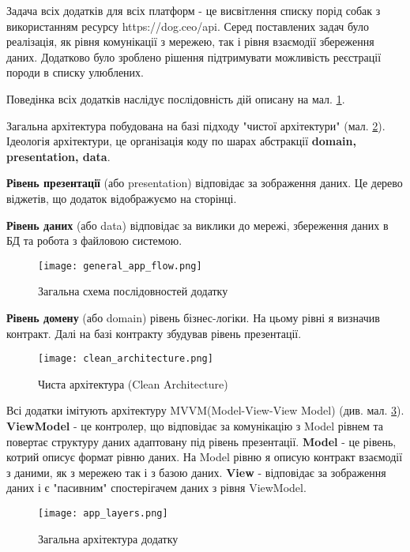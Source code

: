 Задача всіх додатків для всіх платформ - це висвітлення списку порід собак з використанням ресурсу https://dog.ceo/api.
Серед поставлених задач було реалізація, як рівня комунікації з мережею, так і рівня взаємодії збереження
даних. Додатково було зроблено рішення підтримувати можливість реєстрації породи в списку улюблених.

Поведінка всіх додатків наслідує послідовність дій описану на мал. \ref{fig:gen_app_flow}.

Загальна архітектура побудована на базі підходу "чистої архітектури" (мал. \ref{fig:clean_architecture}).
Ідеологія архітектури, це організація коду по шарах абстракції \textbf{domain, presentation, data}.

\textbf{Рівень презентації} (або presentation) відповідає за зображення даних. Це дерево віджетів,
що додаток відображуємо на сторінці.

\textbf{Рівень даних} (або data) відповідає за виклики до мережі, збереження даних в БД та робота з файловою системою.

\FloatBarrier

\begin{figure}[ht]
    \texttt{[image: general\_app\_flow.png]}
    \caption{Загальна схема послідовностей додатку}
    \label{fig:gen_app_flow}
\end{figure}

\textbf{Рівень домену} (або domain) рівень бізнес-логіки. На цьому рівні я визначив контракт. Далі на базі контракту
збудував рівень презентації.

\begin{figure}[h]
    \begin{center}
        \texttt{[image: clean\_architecture.png]}
    \end{center}
    \caption{Чиста архітектура (Clean Architecture)}
    \label{fig:clean_architecture}
\end{figure}

Всі додатки імітують архітектуру MVVM(Model-View-View Model) (див. мал. \ref{fig:gen_app_architecture}).
\textbf{ViewModel} - це контролер, що відповідає за комунікацію з Model рівнем та повертає структуру даних адаптовану під рівень презентації.
\textbf{Model} - це рівень, котрий описує формат рівню даних. На Model рівню я описую контракт взаємодії з даними, як з
мережею так і з базою даних.
\textbf{View} - відповідає за зображення даних і є "пасивним" спостерігачем даних з рівня ViewModel.

\FloatBarrier
\begin{figure}[h]
    \begin{center}
        \texttt{[image: app\_layers.png]}
    \end{center}
    \caption{Загальна архітектура додатку}
    \label{fig:gen_app_architecture}
\end{figure}
\FloatBarrier

